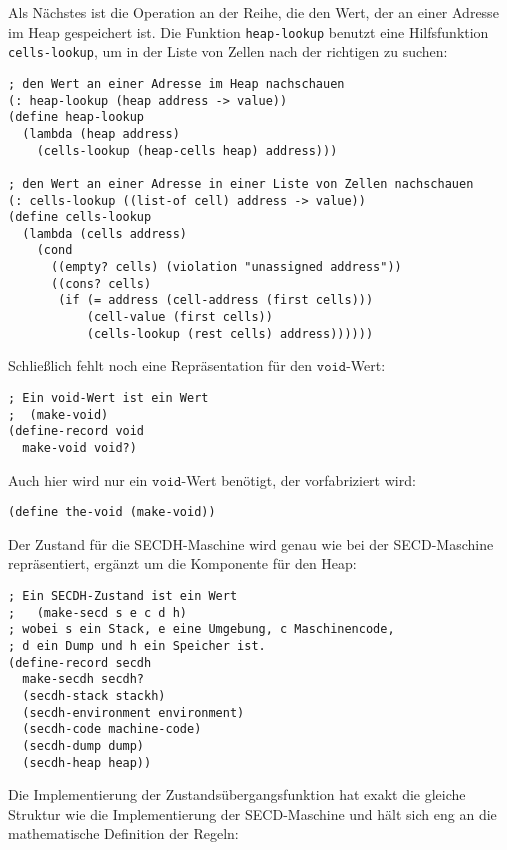 %
Als Nächstes ist die Operation an der Reihe, die den Wert, der an einer
Adresse im Heap gespeichert ist.  Die Funktion \lstinline{heap-lookup} benutzt
eine Hilfsfunktion \lstinline{cells-lookup}, um in der Liste von Zellen
nach der richtigen zu suchen:
%
\begin{lstlisting}
; den Wert an einer Adresse im Heap nachschauen
(: heap-lookup (heap address -> value))
(define heap-lookup
  (lambda (heap address)
    (cells-lookup (heap-cells heap) address)))

; den Wert an einer Adresse in einer Liste von Zellen nachschauen
(: cells-lookup ((list-of cell) address -> value))
(define cells-lookup
  (lambda (cells address)
    (cond
      ((empty? cells) (violation "unassigned address"))
      ((cons? cells)
       (if (= address (cell-address (first cells)))
           (cell-value (first cells))
           (cells-lookup (rest cells) address))))))
\end{lstlisting}
%
Schließlich fehlt noch eine Repräsentation für den $\mathtt{void}$-Wert:
%
\begin{lstlisting}
; Ein void-Wert ist ein Wert
;  (make-void)
(define-record void
  make-void void?)
\end{lstlisting}
%
Auch hier wird nur ein $\mathtt{void}$-Wert benötigt, der 
vorfabriziert wird:
%
\begin{lstlisting}
(define the-void (make-void))
\end{lstlisting}
%
Der Zustand für die SECDH-Maschine wird genau wie bei der
SECD-Maschine repräsentiert, ergänzt um die Komponente für den Heap:
%
\begin{lstlisting}
; Ein SECDH-Zustand ist ein Wert
;   (make-secd s e c d h)
; wobei s ein Stack, e eine Umgebung, c Maschinencode,
; d ein Dump und h ein Speicher ist.
(define-record secdh
  make-secdh secdh?
  (secdh-stack stackh)
  (secdh-environment environment)
  (secdh-code machine-code)
  (secdh-dump dump)
  (secdh-heap heap))
\end{lstlisting}
%
Die Implementierung der Zustandsübergangsfunktion hat exakt die
gleiche Struktur wie die Implementierung der SECD-Maschine und hält
sich eng an die mathematische Definition der Regeln:
%

